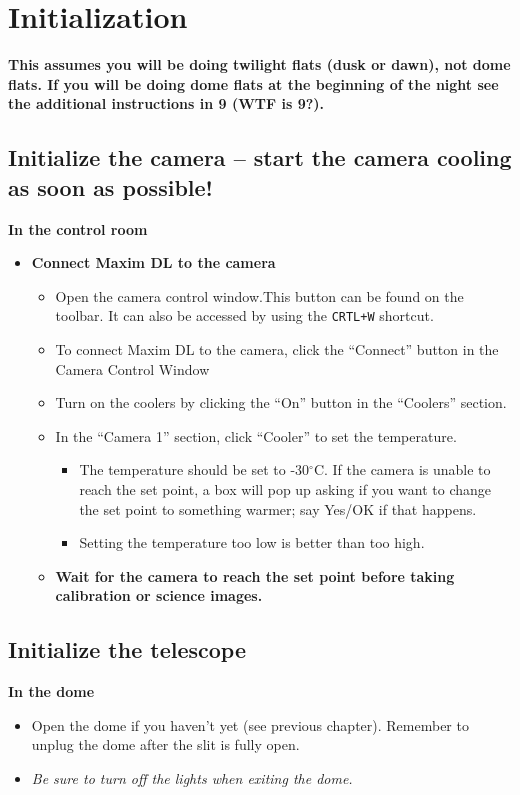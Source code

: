 \documentclass[letterpaper, 12pt]{report}
\begin{document}
\chapter{Initialization}\label{ch:initialization}
\textbf{This assumes you will be doing twilight flats (dusk or dawn), not dome flats. If you will be doing dome flats at the beginning of the night see the additional instructions in 9 (WTF is 9?).} \\

\section{Initialize the camera -- start the camera cooling as soon as possible!}

{\large \textbf{In the control room}}
\begin{itemize}
	\item \textbf{Connect Maxim DL to the camera}
	\begin{itemize}
		\item Open the camera control window.This button can be found on the toolbar. It can also be accessed by using the \texttt{CRTL+W} shortcut.
		\item To connect Maxim DL to the camera, click the ``Connect'' button in the Camera Control Window
		\item Turn on the coolers by clicking the ``On'' button in the ``Coolers'' section.
		\item In the ``Camera 1'' section, click ``Cooler'' to set the temperature.
		\begin{itemize}
			\item The temperature should be set to -30$^\circ$C. If the camera is unable to reach the set point, a box will pop up asking if you want to change the set point to something warmer; say Yes/OK if that happens.
			\item Setting the temperature too low is better than too high.
		\end{itemize}
		\item {\large \textbf{Wait for the camera to reach the set point before taking calibration or science images.}}
	\end{itemize}
\end{itemize}

\section{Initialize the telescope}

\noindent
{\large\textbf{In the dome}}
\begin{itemize}
	\item Open the dome if you haven't yet (see previous chapter). Remember to unplug the dome after the slit is fully open.
	\item \emph{Be sure to turn off the lights when exiting the dome.}
\end{itemize}
\end{document}
